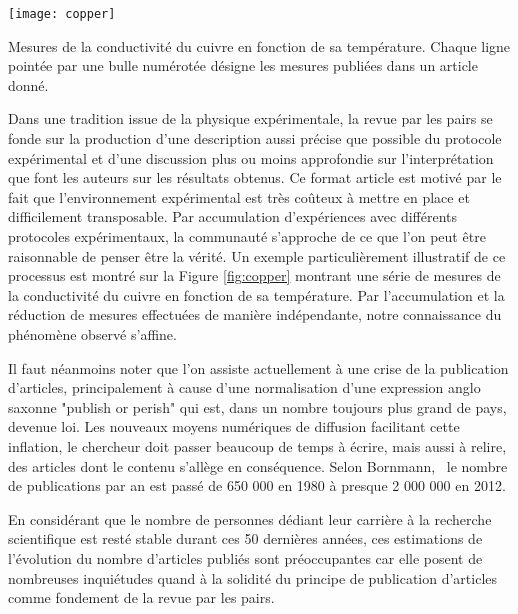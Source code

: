 \begin{marginfigure}
  \texttt{[image: copper]}
  \caption{Mesures de la conductivité du cuivre en fonction de sa température. Chaque ligne pointée par une bulle numérotée désigne les mesures publiées dans un article donné.}
  \label{fig:copper}
\end{marginfigure}

Dans une tradition issue de la physique expérimentale, la revue par les pairs se fonde sur la production d'une description aussi précise que possible du protocole expérimental et d'une discussion plus ou moins approfondie sur l'interprétation que font les auteurs sur les résultats obtenus. Ce format \og article \fg est motivé par le fait que l'environnement expérimental est très coûteux à mettre en place et difficilement transposable. Par accumulation d'expériences avec différents protocoles expérimentaux, la communauté s'approche de ce que l'on peut être raisonnable de penser être la vérité. Un exemple particulièrement illustratif de ce processus est montré sur la Figure \ref{fig:copper} montrant une série de mesures de la conductivité du cuivre en fonction de sa température. Par l'accumulation et la réduction de mesures effectuées de manière indépendante, notre connaissance du phénomène observé s'affine.

Il faut néanmoins noter que l'on assiste actuellement à une \og crise \fg de la publication d'articles, principalement à cause d'une normalisation d'une expression anglo saxonne "publish or perish" qui est, dans un nombre toujours plus grand de pays, devenue loi. Les nouveaux moyens numériques de diffusion facilitant cette inflation, le chercheur doit passer beaucoup de temps à écrire, mais aussi à relire, des articles dont le contenu s'allège en conséquence. Selon Bornmann,~\cite{bornmann2015growth} le nombre de publications par an est passé de 650 000 en 1980 à presque 2 000 000 en 2012.

En considérant que le nombre de personnes dédiant leur carrière à la recherche scientifique est resté stable durant ces 50 dernières années, ces estimations de l'évolution du nombre d'articles publiés sont préoccupantes car elle posent de nombreuses inquiétudes quand à la solidité du principe de publication d'articles comme fondement de la revue par les pairs.

%

